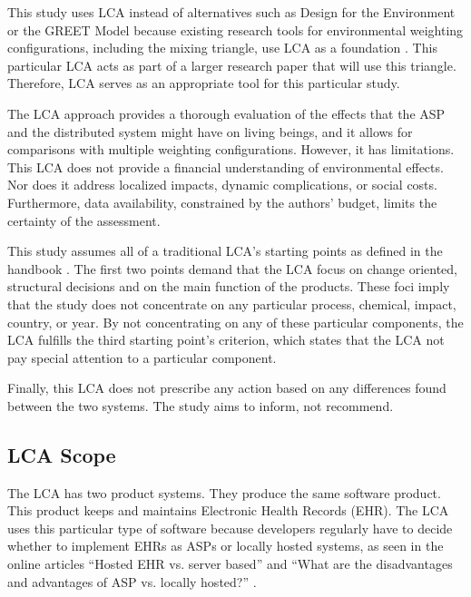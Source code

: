 \documentclass[final,journal,10pt,letterpaper,oneside,twocolumn,compsoc]%
{IEEEtran}
\begin{document}
This study uses LCA instead of alternatives such as Design for the Environment
or the GREET Model because existing research tools
for environmental weighting configurations, including the mixing triangle, use
LCA
as a foundation \cite{triangle}. This particular LCA acts as part of a larger
research paper that will use this triangle.
Therefore, LCA serves as an appropriate tool for this particular study.

The LCA approach provides a
thorough evaluation of the effects that the ASP and the distributed system might
have on living beings, and it allows for comparisons with multiple weighting
configurations. However, it has limitations. This LCA does not provide a
financial understanding
of environmental effects. Nor does it address localized impacts, dynamic
complications, or social costs. Furthermore, data availability, constrained by
the authors' budget, limits the certainty of the assessment. 

This study assumes all of a traditional LCA's starting points as defined in the
handbook \cite{lca}. The first two points demand that the LCA
focus on change oriented, structural decisions and on the main
function of the
products. These foci imply that the study does not concentrate on any particular
process, chemical, impact, country, or year. By not concentrating on any of
these
particular components, the LCA fulfills the third starting point's criterion,
which states that the LCA not pay special attention to a particular component.

Finally, this LCA does not prescribe any action based on any differences found
between the two systems. The study aims to inform, not recommend.

\subsection{LCA Scope}
The LCA has two product systems. They produce the same software product. This
product keeps and maintains Electronic Health Records (EHR). The LCA uses this
particular type of software because developers regularly have to decide whether
to
implement EHRs as ASPs or locally hosted systems, as seen in the online articles
``Hosted EHR vs. server based'' and ``What are the disadvantages and
advantages of ASP vs. locally hosted?'' \cite{mds} \cite{hrsa}.
\end{document}
